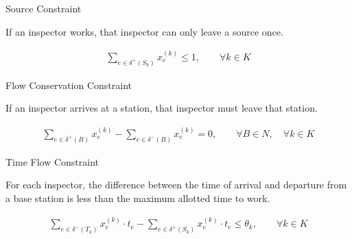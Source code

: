 \documentclass[handout]{beamer}
\begin{document}
\begin{frame}{Source Constraint}
\begin{tcolorbox}[colback=yellow!5!white,colframe=yellow!75!black, title=Intuition]
If an inspector works, that inspector can only leave a source once.
\end{tcolorbox} 
\vspace{5mm}
\begin{tcolorbox}[colback=blue!5!white,colframe=blue!75!black]
\begin{align*}
        \sum_{e\in\delta^+(S_k)}x_e^{(k)} \le 1, \qquad \forall k\in K
\end{align*}
\end{tcolorbox}
\end{frame}

\begin{frame}{Flow Conservation Constraint}
 \begin{tcolorbox}[colback=yellow!5!white,colframe=yellow!75!black, title=Intuition]
  If an inspector arrives at a station, that inspector must leave that station.
\end{tcolorbox} 
\vspace{5mm}

\begin{tcolorbox}[colback=blue!5!white,colframe=blue!75!black]
\begin{align*}
        \sum_{e\in\delta^+(B)}x_e^{(k)} - \sum_{e\in\delta^-(B)}x_e^{(k)} = 0, \qquad \forall B\in N,\quad \forall k\in K
\end{align*}
\end{tcolorbox}
\end{frame}


\begin{frame}{Time Flow Constraint}
\begin{tcolorbox}[colback=yellow!5!white,colframe=yellow!75!black, title=Intuition]
   For each inspector, the difference between the time of arrival and departure from a base station is less than the maximum allotted time to work.
\end{tcolorbox} 
\vspace{5mm}

\begin{tcolorbox}[colback=blue!5!white,colframe=blue!75!black]
\begin{align*}
        \sum_{e\in\delta^-(T_k)}x_e^{(k)}\cdot t_e - \sum_{e\in\delta^+(S_k)}x_e^{(k)}\cdot t_e \le \theta_k,\qquad \forall k\in K
\end{align*}
\end{tcolorbox}
\end{frame}
\end{document}
